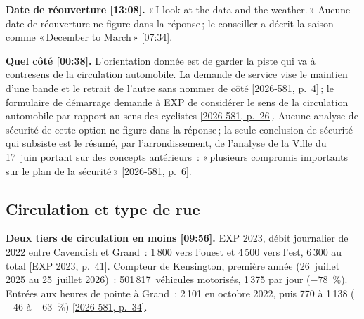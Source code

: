 \documentclass[11pt,letterpaper]{article}
\newcommand{\repourl}{https://github.com/OpenMobilityData/Terrebonne-open-sources}
\newcommand{\pagesurl}{https://openmobilitydata.github.io/Terrebonne-access-requests}
\newcommand{\cliptime}[1]{\textsf{\small[#1]}}
\newcommand{\pgl}[2]{\href{\pagesurl/2026-581/raw/01_emails_mandate_counts.pdf\#page=#1}{\textsf{\small[2026-581, p.~#2]}}}
\newcommand{\pg}[1]{\pgl{#1}{#1}}
\newcommand{\exppg}[1]{\href{\repourl/blob/main/2023-exp-mobility-study/raw/EXP_Etude_de_mobilite_rue_de_Terrebonne_2023.pdf}{\textsf{\small[EXP 2023, p.~#1]}}}
\begin{document}
\textbf{Date de réouverture \cliptime{13:08}.} «\,I look at the data and
the weather.\,» Aucune date de réouverture ne figure dans la réponse\,; le
conseiller a décrit la saison comme «\,December to March\,»
\cliptime{07:34}.

\textbf{Quel côté \cliptime{00:38}.} L'orientation donnée est de garder la
piste qui va à contresens de la circulation automobile. La demande de
service vise le maintien d'une bande et le retrait de l'autre sans nommer
de côté \pg{4}\,; le formulaire de démarrage demande à EXP de considérer le
sens de la circulation automobile par rapport au sens des cyclistes
\pg{26}. Aucune analyse de sécurité de cette option ne figure dans la
réponse\,; la seule conclusion de sécurité qui subsiste est le résumé, par
l'arrondissement, de l'analyse de la Ville du 17~juin portant sur des
concepts antérieurs~: «\,plusieurs compromis importants sur le plan de la
sécurité\,» \pg{6}.

\subsection{Circulation et type de rue}

\textbf{Deux tiers de circulation en moins \cliptime{09:56}.} EXP 2023,
débit journalier de 2022 entre Cavendish et Grand~: 1\,800 vers l'ouest et
4\,500 vers l'est, 6\,300 au total \exppg{41}. Compteur de Kensington,
première année (26~juillet 2025 au 25~juillet 2026)~: 501\,817~véhicules
motorisés, 1\,375 par jour ($-78$~\%). Entrées aux heures de pointe à
Grand~: 2\,101 en octobre 2022, puis 770 à 1\,138 ($-46$ à $-63$~\%)
\pg{34}.
\end{document}
